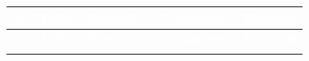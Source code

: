 \documentclass[12pt,a4paper]{article}
\begin{document}
\begin{longtable}{|>{\centering\arraybackslash}p{1cm}|>{\raggedright\arraybackslash}p{3.5cm}|>{\raggedright\arraybackslash}p{3.5cm}|>{\raggedright\arraybackslash}p{3.5cm}|>{\centering\arraybackslash}p{2.5cm}|}
\hline
\rowcolor{headercolor}
\textcolor{white}{\textbf{\#}} & \textcolor{white}{\textbf{Módulo}} & \textcolor{white}{\textbf{Requisitos}} & \textcolor{white}{\textbf{Componente}} & \textcolor{white}{\textbf{Prioridad}} \\
\hline
\endfirsthead
\hline
\rowcolor{headercolor}
\textcolor{white}{\textbf{\#}} & \textcolor{white}{\textbf{Módulo}} & \textcolor{white}{\textbf{Requisitos}} & \textcolor{white}{\textbf{Componente}} & \textcolor{white}{\textbf{Prioridad}} \\
\hline
\endhead
\hline
\endlastfoot


\end{longtable}
\end{document}
